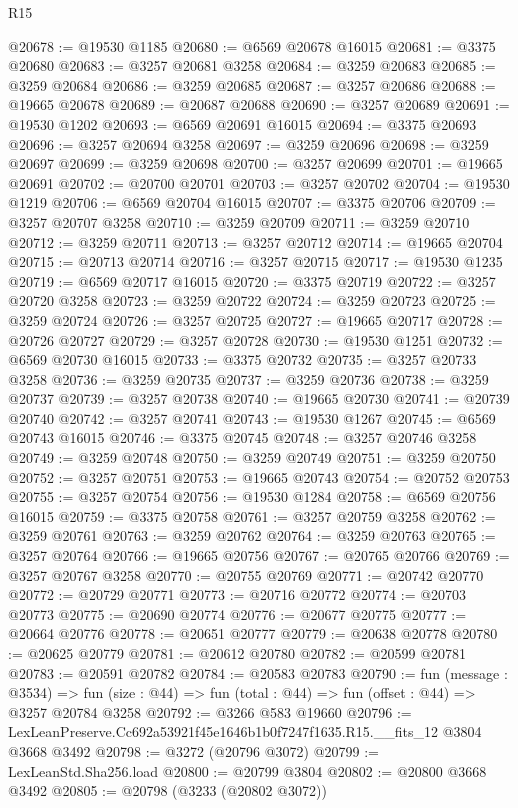 \begin{lexlean}{R15}
\begin{coremodule}
@20678 := @19530 @1185
@20680 := @6569 @20678 @16015
@20681 := @3375 @20680
@20683 := @3257 @20681 @3258
@20684 := @3259 @20683
@20685 := @3259 @20684
@20686 := @3259 @20685
@20687 := @3257 @20686
@20688 := @19665 @20678
@20689 := @20687 @20688
@20690 := @3257 @20689
@20691 := @19530 @1202
@20693 := @6569 @20691 @16015
@20694 := @3375 @20693
@20696 := @3257 @20694 @3258
@20697 := @3259 @20696
@20698 := @3259 @20697
@20699 := @3259 @20698
@20700 := @3257 @20699
@20701 := @19665 @20691
@20702 := @20700 @20701
@20703 := @3257 @20702
@20704 := @19530 @1219
@20706 := @6569 @20704 @16015
@20707 := @3375 @20706
@20709 := @3257 @20707 @3258
@20710 := @3259 @20709
@20711 := @3259 @20710
@20712 := @3259 @20711
@20713 := @3257 @20712
@20714 := @19665 @20704
@20715 := @20713 @20714
@20716 := @3257 @20715
@20717 := @19530 @1235
@20719 := @6569 @20717 @16015
@20720 := @3375 @20719
@20722 := @3257 @20720 @3258
@20723 := @3259 @20722
@20724 := @3259 @20723
@20725 := @3259 @20724
@20726 := @3257 @20725
@20727 := @19665 @20717
@20728 := @20726 @20727
@20729 := @3257 @20728
@20730 := @19530 @1251
@20732 := @6569 @20730 @16015
@20733 := @3375 @20732
@20735 := @3257 @20733 @3258
@20736 := @3259 @20735
@20737 := @3259 @20736
@20738 := @3259 @20737
@20739 := @3257 @20738
@20740 := @19665 @20730
@20741 := @20739 @20740
@20742 := @3257 @20741
@20743 := @19530 @1267
@20745 := @6569 @20743 @16015
@20746 := @3375 @20745
@20748 := @3257 @20746 @3258
@20749 := @3259 @20748
@20750 := @3259 @20749
@20751 := @3259 @20750
@20752 := @3257 @20751
@20753 := @19665 @20743
@20754 := @20752 @20753
@20755 := @3257 @20754
@20756 := @19530 @1284
@20758 := @6569 @20756 @16015
@20759 := @3375 @20758
@20761 := @3257 @20759 @3258
@20762 := @3259 @20761
@20763 := @3259 @20762
@20764 := @3259 @20763
@20765 := @3257 @20764
@20766 := @19665 @20756
@20767 := @20765 @20766
@20769 := @3257 @20767 @3258
@20770 := @20755 @20769
@20771 := @20742 @20770
@20772 := @20729 @20771
@20773 := @20716 @20772
@20774 := @20703 @20773
@20775 := @20690 @20774
@20776 := @20677 @20775
@20777 := @20664 @20776
@20778 := @20651 @20777
@20779 := @20638 @20778
@20780 := @20625 @20779
@20781 := @20612 @20780
@20782 := @20599 @20781
@20783 := @20591 @20782
@20784 := @20583 @20783
@20790 := fun (message : @3534) =>
  fun (size : @44) => fun (total : @44) => fun (offset : @44) => @3257 @20784 @3258
@20792 := @3266 @583 @19660
@20796 := LexLeanPreserve.Cc692a53921f45e1646b1b0f7247f1635.R15.__fits_12 @3804 @3668 @3492
@20798 := @3272 (@20796 @3072)
@20799 := LexLeanStd.Sha256.load
@20800 := @20799 @3804
@20802 := @20800 @3668 @3492
@20805 := @20798 (@3233 (@20802 @3072))

\end{coremodule}
\end{lexlean}
